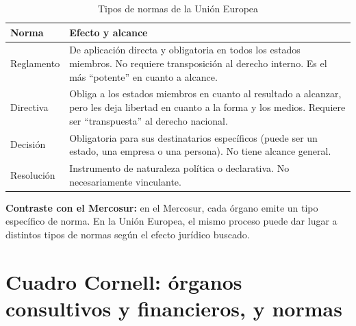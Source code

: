 \documentclass[12pt,oneside]{book}
\begin{document}
\begin{table}[H]
\centering
\caption{Tipos de normas de la Unión Europea}
\small
\begin{tabularx}{\textwidth}{@{}P{2.6cm}Y@{}}
\toprule
\textbf{Norma} & \textbf{Efecto y alcance} \\
\midrule
Reglamento & De aplicación directa y obligatoria en todos los estados miembros. No requiere transposición al derecho interno. Es el más ``potente'' en cuanto a alcance. \\
\addlinespace
Directiva & Obliga a los estados miembros en cuanto al resultado a alcanzar, pero les deja libertad en cuanto a la forma y los medios. Requiere ser ``transpuesta'' al derecho nacional. \\
\addlinespace
Decisión & Obligatoria para sus destinatarios específicos (puede ser un estado, una empresa o una persona). No tiene alcance general. \\
\addlinespace
Resolución & Instrumento de naturaleza política o declarativa. No necesariamente vinculante. \\
\bottomrule
\end{tabularx}
\end{table}

\textbf{Contraste con el Mercosur:} en el Mercosur, cada órgano emite un tipo específico de norma. En la Unión Europea, el mismo proceso puede dar lugar a distintos tipos de normas según el efecto jurídico buscado.

\section{Cuadro Cornell: órganos consultivos y financieros, y normas}
\end{document}
